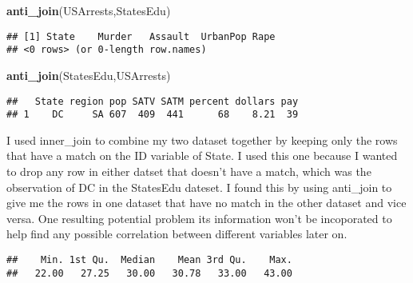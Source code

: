 \documentclass[
]{article}
\newenvironment{Shaded}{\begin{snugshade}}{\end{snugshade}}
\newcommand{\CommentTok}[1]{\textcolor[rgb]{0.56,0.35,0.01}{\textit{#1}}}
\newcommand{\KeywordTok}[1]{\textcolor[rgb]{0.13,0.29,0.53}{\textbf{#1}}}
\newcommand{\NormalTok}[1]{#1}
\newcommand{\OperatorTok}[1]{\textcolor[rgb]{0.81,0.36,0.00}{\textbf{#1}}}
\begin{document}
\begin{Shaded}
\begin{Highlighting}[]
\KeywordTok{anti_join}\NormalTok{(USArrests,StatesEdu)}
\end{Highlighting}
\end{Shaded}

\begin{verbatim}
## [1] State    Murder   Assault  UrbanPop Rape    
## <0 rows> (or 0-length row.names)
\end{verbatim}

\begin{Shaded}
\begin{Highlighting}[]
\KeywordTok{anti_join}\NormalTok{(StatesEdu,USArrests)}
\end{Highlighting}
\end{Shaded}

\begin{verbatim}
##   State region pop SATV SATM percent dollars pay
## 1    DC     SA 607  409  441      68    8.21  39
\end{verbatim}

I used inner\_join to combine my two dataset together by keeping only
the rows that have a match on the ID variable of State. I used this one
because I wanted to drop any row in either datset that doesn't have a
match, which was the observation of DC in the StatesEdu dateset. I found
this by using anti\_join to give me the rows in one dataset that have no
match in the other dataset and vice versa. One resulting potential
problem its information won't be incoporated to help find any possible
correlation between different variables later on.

\begin{Shaded}
\end{Shaded}

\begin{verbatim}
##    Min. 1st Qu.  Median    Mean 3rd Qu.    Max. 
##   22.00   27.25   30.00   30.78   33.00   43.00
\end{verbatim}
\end{document}
